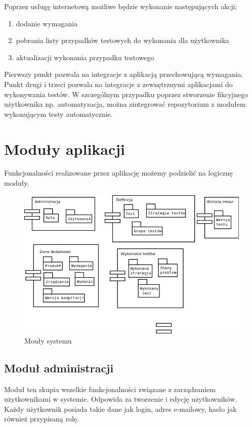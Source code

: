 Poprzez usługę internetową możliwe będzie wykonanie następujących akcji:
\begin{enumerate}
  \item dodanie wymagania
  \item pobrania listy przypadków testowych do wykonania dla użytkownika
  \item aktualizacji wykonania przypadku testowego
\end{enumerate}
Pierwszy punkt pozwala na integracje z aplikacją przechowującą wymagania. Punkt drugi i trzeci pozwala na integracje z zewnętrznymi aplikacjami do wykonywania testów. W szczególnym przypadku poprzez stworzenie fikcyjnego użytkownika np. automatyzacja, można zintegrować repozytorium z modułem wykonującym testy automatycznie.


\section{Moduły aplikacji}
Funkcjonalności realizowane przez aplikację możemy podzielić na logicznę moduły.
\begin{figure}[h]
\centerline{\includegraphics[scale=0.5]{img/komponenty.png}}
\caption{Mouły systemu}
\label{fig:moduly}
\end{figure}

\subsection{Moduł administracji}

Moduł ten skupia wszelkie funkcjonalności związane z zarządzaniem użytkownikami w systemie. Odpowida za tworzenie i edycję użytkowników. Każdy użytkownik posiada takie dane jak login, adres e-mailowy, hasło jak również przypisaną rolę.

